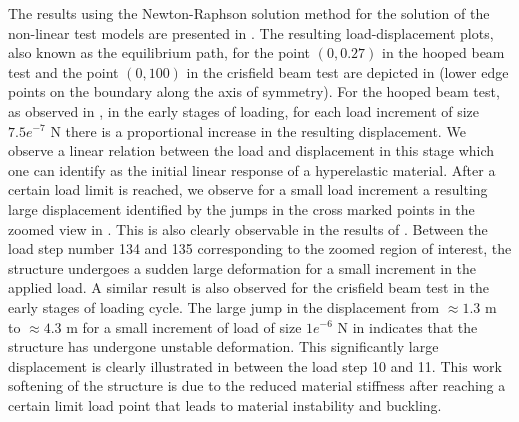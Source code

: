 The results using the Newton-Raphson solution method for the solution of the non-linear test models are presented in . The resulting load-displacement plots, also known as the equilibrium path, for the point $(0, 0.27)$ in the hooped beam test and the point $(0, 100)$ in the crisfield beam test are depicted in  (lower edge points on the boundary along the axis of symmetry). For the hooped beam test, as observed in , in the early stages of loading, for each load increment of size $7.5e^{-7}$ N there is a proportional increase in the resulting displacement. We observe a linear relation between the load and displacement in this stage which one can identify as the initial linear response of a hyperelastic material. After a certain load limit is reached, we observe for a small load increment a resulting large displacement identified by the jumps in the cross marked points in the zoomed view in . This is also clearly observable in the results of . Between the load step number 134 and 135 corresponding to the zoomed region of interest, the structure undergoes a sudden large deformation for a small increment in the applied load. A similar result is also observed for the crisfield beam test in the early stages of loading cycle. The large jump in the displacement from $\approx 1.3$ m to $\approx 4.3$ m for a small increment of load of size $1e^{-6}$ N in  indicates that the structure has undergone unstable deformation. This significantly large displacement is clearly illustrated in  between the load step 10 and 11. This work softening of the structure is due to the reduced material stiffness after reaching a certain limit load point that leads to material instability and buckling. \par 

